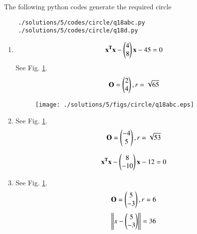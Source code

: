 The following python codes generate the required circle
	\begin{lstlisting}
	./solutions/5/codes/circle/q18abc.py
	./solutions/5/codes/circle/q18d.py
	\end{lstlisting}


\begin{enumerate}

\item \begin{align} 
\mathbf{x^Tx} - \begin{pmatrix}4\\8\end{pmatrix}\mathbf{x} -45 = 0
\end{align}
See Fig. \ref{fig:4.2.5_qoeabc}.
\begin{align}
\mathbf{O} = \begin{pmatrix}2\\4\end{pmatrix}, r = \sqrt{65} 
\end{align}
	\begin{figure}[!ht]
	\centering
	\texttt{[image: ./solutions/5/figs/circle/q18abc.eps]}
	\caption{}
	\label{fig:4.2.5_qoeabc}	
	\end{figure}

\item See Fig. \ref{fig:4.2.5_qoeabc}.
\begin{align}
\mathbf{O} = \begin{pmatrix}-4\\5\end{pmatrix}, r = \sqrt{53} 
\end{align}

\begin{align} 
\mathbf{x^Tx} - \begin{pmatrix}8\\-10\end{pmatrix}\mathbf{x} - 12 = 0
\end{align}


\item See Fig. \ref{fig:4.2.5_qoeabc}.
\begin{align}
\mathbf{O} = \begin{pmatrix}5\\-3\end{pmatrix}, r = 6
\end{align}
\begin{align} 
\left\lVert x - \begin{pmatrix}5\\-3\end{pmatrix}\right\rVert = 36
\end{align}




\end{enumerate}

